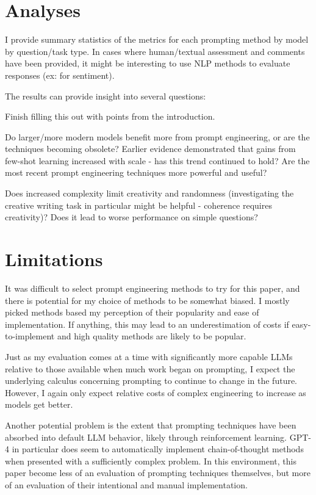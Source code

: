 \documentclass[11pt]{article}
\begin{document}
\section*{Analyses}

I provide summary statistics of the metrics for each prompting method by model by question/task type. In cases where human/textual assessment and comments have been provided, it might be interesting to use NLP methods to evaluate responses (ex: for sentiment).

The results can provide insight into several questions:

Finish filling this out with points from the introduction.

Do larger/more modern models benefit more from prompt engineering, or are the techniques becoming obsolete? Earlier evidence demonstrated that gains from few-shot learning increased with scale - has this trend continued to hold? \cite{brown_language_2020} Are the most recent prompt engineering techniques more powerful and useful?

Does increased complexity limit creativity and randomness (investigating the creative writing task in particular might be helpful - coherence requires creativity)? Does it lead to worse performance on simple questions?

\section*{Limitations}

It was difficult to select prompt engineering methods to try for this paper, and there is potential for my choice of methods to be somewhat biased. I mostly picked methods based my perception of their popularity and ease of implementation. If anything, this may lead to an underestimation of costs if easy-to-implement and high quality methods are likely to be popular.

Just as my evaluation comes at a time with significantly more capable LLMs relative to those available when much work began on prompting, I expect the underlying calculus concerning prompting to continue to change in the future. However, I again only expect relative costs of complex engineering to increase as models get better.

Another potential problem is the extent that prompting techniques have been absorbed into default LLM behavior, likely through reinforcement learning. GPT-4 in particular does seem to automatically implement chain-of-thought methods when presented with a sufficiently complex problem. In this environment, this paper become less of an evaluation of prompting techniques themselves, but more of an evaluation of their intentional and manual implementation.
\end{document}
